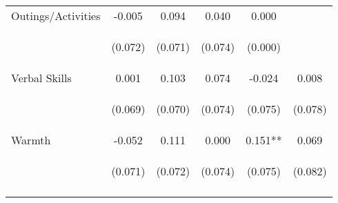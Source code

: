 \begin{tabular}{lccccc}
\noalign{\smallskip}Outings/Activities & -0.005 & 0.094 & 0.040 & 0.000 & \\
 & \begin{footnotesize}(0.072)\end{footnotesize} & \begin{footnotesize}(0.071)\end{footnotesize} & \begin{footnotesize}(0.074)\end{footnotesize} & \begin{footnotesize}(0.000)\end{footnotesize} & \begin{footnotesize}\end{footnotesize}\\
\noalign{\smallskip}Verbal Skills & 0.001 & 0.103 & 0.074 & -0.024 & 0.008\\
 & \begin{footnotesize}(0.069)\end{footnotesize} & \begin{footnotesize}(0.070)\end{footnotesize} & \begin{footnotesize}(0.074)\end{footnotesize} & \begin{footnotesize}(0.075)\end{footnotesize} & \begin{footnotesize}(0.078)\end{footnotesize}\\
\noalign{\smallskip}Warmth & -0.052 & 0.111 & 0.000 & 0.151** & 0.069\\
 & \begin{footnotesize}(0.071)\end{footnotesize} & \begin{footnotesize}(0.072)\end{footnotesize} & \begin{footnotesize}(0.074)\end{footnotesize} & \begin{footnotesize}(0.075)\end{footnotesize} & \begin{footnotesize}(0.082)\end{footnotesize}\\
\noalign{\smallskip}\hline\end{tabular}\\
